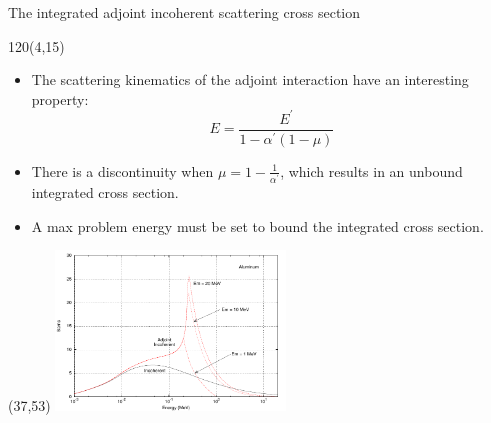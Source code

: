 \documentclass{beamer}
\begin{document}
\begin{frame}{The integrated adjoint incoherent scattering cross section}

  \begin{textblock}{120}(4,15)
    \begin{itemize}
      \item The scattering kinematics of the adjoint interaction have an
        interesting property:
        \begin{equation*}
          E = \frac{E^{'}}{1-\alpha^{'}(1-\mu)}
        \end{equation*}
      \item There is a discontinuity when $\mu = 1 - \frac{1}{\alpha^{'}}$,
        which results in an unbound integrated cross section.
      \item A max problem energy must be set to bound the integrated 
        cross section.
    \end{itemize}
  \end{textblock}

  \begin{textblock}{20}(37,53)
    \includegraphics[width=2.4in]{figures/adjoint_and_forward_incoherent_cross_section-13.pdf}
  \end{textblock}
  
\end{frame}

\end{document}
